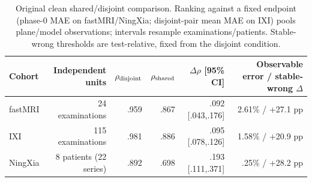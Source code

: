 \begin{table}[t]
\centering
\caption{Original clean shared/disjoint comparison. Ranking against a fixed endpoint (phase-0 MAE on fastMRI/NingXia; disjoint-pair mean MAE on IXI) pools plane/model observations; intervals resample examinations/patients. Stable-wrong thresholds are test-relative, fixed from the disjoint condition.}
\label{tab:controlled}
\setlength{\tabcolsep}{4pt}
\begin{tabular}{lrrrrr}
\toprule
Cohort & Independent units & $\rho_{\rm disjoint}$ & $\rho_{\rm shared}$ & $\Delta\rho$ [95\% CI] & Observable error / stable-wrong $\Delta$ \\
\midrule
fastMRI & 24 examinations & .959 & .867 & .092 [.043,.176] & 2.61\% / +27.1 pp \\
IXI & 115 examinations & .981 & .886 & .095 [.078,.126] & 1.58\% / +20.9 pp \\
NingXia & 8 patients (22 series) & .892 & .698 & .193 [.111,.371] & .25\% / +28.2 pp \\
\bottomrule
\end{tabular}
\end{table}